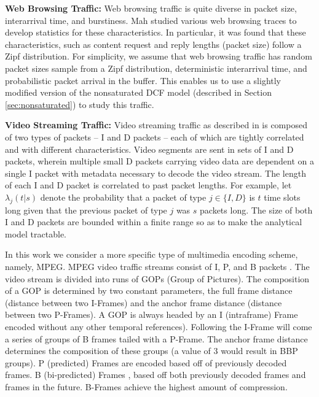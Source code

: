 \documentclass[conference]{IEEEtran}
\begin{document}
\noindent
\textbf{Web Browsing Traffic:} Web browsing traffic is quite diverse in packet size, interarrival time, and burstiness. Mah \cite{mah1997empirical} studied various web browsing traces to develop statistics for these characteristics. In particular, it was found that these characteristics, such as content request and reply lengths (packet size) follow a Zipf distribution. For simplicity, we assume that web browsing traffic has random packet sizes sample from a Zipf distribution, deterministic interarrival time, and probabilistic packet arrival in the buffer. This enables us to use a slightly modified version of the nonsaturated DCF model (described in Section \ref{sec:nonsaturated}) to study this traffic. 

\noindent
\textbf{Video Streaming Traffic:} Video streaming traffic as described in \cite{badia2010markov} is composed of two types of packets -- I and D packets -- each of which are tightly correlated and with different characteristics. Video segments are sent in sets of I and D packets, wherein multiple small D packets carrying video data are dependent on a single I packet with metadata necessary to decode the video stream. The length of each I and D packet is correlated to past packet lengths. For example, let $\lambda_j(t|s)$ denote the probability that a packet of type $j \in \{I ,D \}$ is $t$ time slots long given that the previous packet of type $j$ was $s$ packets long. The size of both I and D packets are bounded within a finite range so as to make the analytical model tractable. 

In this work we consider a more specific type of multimedia encoding scheme, namely, MPEG. MPEG video traffic streams consist of I, P, and B packets \cite{netperfeval2004}\cite{trafficqual2008}. The video stream is divided into runs of GOPs (Group of Pictures). The composition of a GOP is determined by two constant parameters, the full frame distance (distance between two I-Frames) and the anchor frame distance (distance between two P-Frames). A GOP is always headed by an I (intraframe) Frame  encoded without any other temporal references). Following the I-Frame will come a series of groups of B frames tailed with a P-Frame. The anchor frame distance determines the composition of these groups (a value of 3 would result in BBP groups). P (predicted) Frames  are encoded based off of previously decoded frames. B (bi-predicted) Frames , based off both previously decoded frames and frames in the future. B-Frames achieve the highest amount of compression.
\end{document}
